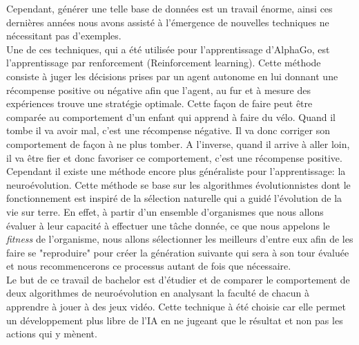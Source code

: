 \documentclass{article}
\begin{document}
Cependant, générer une telle base de données est un travail énorme, ainsi ces dernières années nous avons assisté à l'émergence de nouvelles techniques ne nécessitant pas d'exemples.\\

Une de ces techniques, qui a été utilisée pour l'apprentissage d'AlphaGo\cite{alphago}, est l'apprentissage par renforcement (Reinforcement learning). Cette méthode consiste à juger les décisions prises par un agent autonome en lui donnant une récompense positive ou négative afin que l'agent, au fur et à mesure des expériences trouve une stratégie optimale\cite{wikirl}. Cette façon de faire peut être comparée au comportement d'un enfant qui apprend à faire du vélo. Quand il tombe il va avoir mal, c'est une récompense négative. Il va donc corriger son comportement de façon à ne plus tomber. A l'inverse, quand il arrive à aller loin, il va être fier et donc favoriser ce comportement, c'est une récompense positive.\\

Cependant il existe une méthode encore plus généraliste pour l'apprentissage: la neuroévolution. Cette méthode se base sur les algorithmes évolutionnistes dont le fonctionnement est inspiré de la sélection naturelle qui a guidé l'évolution de la vie sur terre. En effet, à partir d'un ensemble d'organismes que nous allons évaluer à leur capacité à effectuer une tâche donnée, ce que nous appelons le \textit{fitness} de l'organisme, nous allons sélectionner les meilleurs d'entre eux afin de les faire se "reproduire" pour créer la génération suivante qui sera à son tour évaluée et nous recommencerons ce processus autant de fois que nécessaire\cite{wikineuroevolution}.\\

Le but de ce travail de bachelor est d'étudier et de comparer le comportement de deux algorithmes de neuroévolution en analysant la faculté de chacun à apprendre à jouer à des jeux vidéo. Cette technique à été choisie car elle permet un développement plus libre de l'IA en ne jugeant que le résultat et non pas les actions qui y mènent.\\
\end{document}
